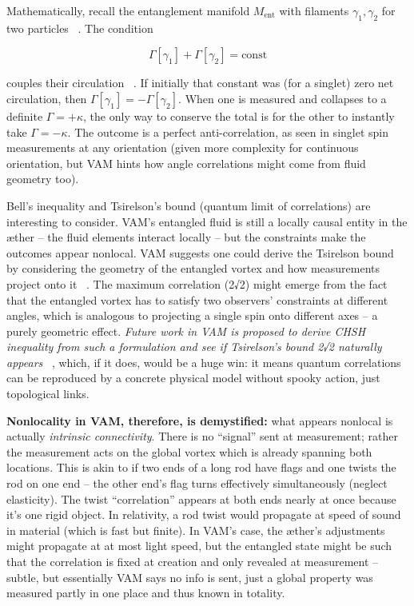 \documentclass[a4paper, aps,preprint,superscriptaddress, 12pt]{revtex4}
\begin{document}
Mathematically, recall the entanglement manifold $M_{\text{ent}}$ with filaments ${\gamma_1, \gamma_2}$ for two particles~\cite{Iskandarani2025c} . The condition

\begin{equation}
    \Gamma[\gamma_1] + \Gamma[\gamma_2] = \text{const}
\end{equation}

couples their circulation~\cite{Iskandarani2025c} . If initially that constant was (for a singlet) zero net circulation, then $\Gamma[\gamma_1] = -\Gamma[\gamma_2]$. When one is measured and collapses to a definite $\Gamma = +\kappa$, the only way to conserve the total is for the other to instantly take $\Gamma = -\kappa$. The outcome is a perfect anti-correlation, as seen in singlet spin measurements at any orientation (given more complexity for continuous orientation, but VAM hints how angle correlations might come from fluid geometry too).


Bell’s inequality and Tsirelson’s bound (quantum limit of correlations) are interesting to consider. VAM’s entangled fluid is still a locally causal entity in the æther – the fluid elements interact locally – but the constraints make the outcomes appear nonlocal. VAM suggests one could derive the Tsirelson bound by considering the geometry of the entangled vortex and how measurements project onto it~\cite{Iskandarani2025c} . The maximum correlation (2√2) might emerge from the fact that the entangled vortex has to satisfy two observers’ constraints at different angles, which is analogous to projecting a single spin onto different axes – a purely geometric effect. \textit{Future work in VAM is proposed to derive CHSH inequality from such a formulation and see if Tsirelson’s bound 2√2 naturally appears}~\cite{Iskandarani2025c} , which, if it does, would be a huge win: it means quantum correlations can be reproduced by a concrete physical model without spooky action, just topological links.


\textbf{Nonlocality in VAM, therefore, is demystified:} what appears nonlocal is actually \textit{intrinsic connectivity}. There is no “signal” sent at measurement; rather the measurement acts on the global vortex which is already spanning both locations. This is akin to if two ends of a long rod have flags and one twists the rod on one end – the other end’s flag turns effectively simultaneously (neglect elasticity). The twist “correlation” appears at both ends nearly at once because it’s one rigid object. In relativity, a rod twist would propagate at speed of sound in material (which is fast but finite). In VAM’s case, the æther’s adjustments might propagate at at most light speed, but the entangled state might be such that the correlation is fixed at creation and only revealed at measurement – subtle, but essentially VAM says no info is sent, just a global property was measured partly in one place and thus known in totality.
\end{document}
